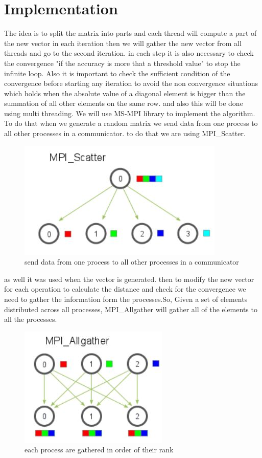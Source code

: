 \documentclass[preprint,pre,floats,aps,amsmath,amssymb]{revtex4}
\begin{document}
\section{Implementation}
\label{sec:implementation }
The idea is to split the matrix into parts and each thread will compute a part of the new vector in each iteration then we will gather the new vector from all threads and go to the second iteration. in each step it is also necessary to check the convergence "if the accuracy is more that a threshold value" to stop the infinite loop.
Also it is important to check the sufficient condition of the convergence before starting any iteration to avoid the non convergence situations which holds when the absolute value of a diagonal element is bigger than the summation of all other elements on the same row. and also this will be done using multi threading. We will use MS-MPI library to implement the algorithm.
To do that when we generate a random matrix we send data from one process to all other processes in a communicator. to do that we are using MPI\_Scatter\cite{MPI}.
\begin{figure}[h]
	\centering
	\caption{send data from one process to all other processes in a communicator}
	\includegraphics[scale=0.8]{1} 
	
\end{figure}
as well it was used when the vector is generated.
then to modify the new vector for each operation to calculate the distance and check for the convergence we need to gather the information form the processes.So, Given a set of elements distributed across all processes, MPI\_Allgather will gather all of the elements to all the processes\cite{MPI}. 
\begin{figure}[H]
	\centering
	\caption{ each process are gathered in order of their rank}
	\includegraphics[scale=0.8]{2} 
	
\end{figure}
\end{document}
